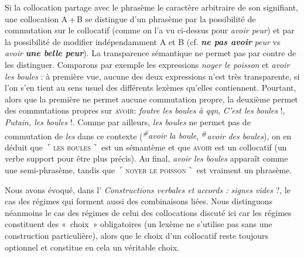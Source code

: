 Si la collocation partage avec le phrasème le caractère arbitraire de son signifiant, une collocation A\,+\,B se distingue d’un phrasème par la possibilité de commutation sur le collocatif (comme on l’a vu ci-dessus pour \textit{avoir peur}) et par la possibilité de modifier indépendamment A et B (cf. \textbf{\textit{ne pas avoir}} \textit{peur} vs \textit{avoir} \textbf{\textit{une belle peur}}). La transparence sémantique ne permet pas par contre de les distinguer. Comparons par exemple les expressions \textit{noyer le poisson} et \textit{avoir les boules} : à première vue, aucune des deux expressions n’est très transparente, si l’on s’en tient au sens usuel des différents lexèmes qu’elles contiennent. Pourtant, alors que la première ne permet aucune commutation propre, la deuxième permet des commutations propres sur \textsc{avoir}: \textit{foutre les boules à qqn}, \textit{C’est les boules} !, \textit{Putain, les boules} !. Comme par ailleurs, \textit{les boules} ne permet pas de commutation de \textit{les} dans ce contexte (\textit{\textsuperscript{\#}}\textit{avoir la boule}, \textsuperscript{\#}\textit{avoir des boules}), on en déduit que $⌜$\textsc{les} \textsc{boules}$⌝$ est un sémantème et que \textsc{avoir} est un collocatif (un verbe support pour être plus précis). Au final, \textit{avoir les boules} apparaît comme une semi-phrasème, tandis que $⌜$\textsc{noyer} \textsc{le} \textsc{poisson}$⌝$ est vraiment un phrasème.

Nous avons évoqué, dans l’ \textit{Constructions verbales et accords : signes vides} ?, le cas des régimes qui forment aussi des combinaisons liées. Nous distinguons néanmoins le cas des régimes de celui des collocations discuté ici car les régimes constituent des «~choix~» obligatoires (un lexème ne s’utilise pas sans une construction particulière), alors que le choix d’un collocatif reste toujours optionnel et constitue en cela un véritable choix.\largerpage

